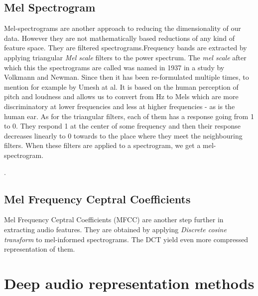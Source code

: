 \subsection{Mel Spectrogram}\label{ssec:mel_spectrograms_intro}
Mel-spectrograms are another approach to reducing the dimensionality of our data. However they are not mathematically based reductions of any kind of feature space. They are filtered spectrograms.Frequency bands are extracted by applying triangular \textit{Mel scale} filters to the power spectrum. The \textit{mel scale} after which this the spectrograms are called was named in 1937 in a study \cite{1937ASAJ....8..185S} by Volkmann and Newman. Since then it has been re-formulated multiple times, to mention for example \cite{mel_scale_fit} by Umesh at al. It is based on the human perception of pitch and loudness and allows us to convert from Hz to Mels which are more discriminatory at lower frequencies and less at higher frequencies - as is the human ear. As for the triangular filters, each of them has a response going from 1 to 0. They respond 1 at the center of some frequency and then their response decreases linearly to 0 towards to the place where they meet the neighbouring filters. When these filters are applied to a spectrogram, we get a mel-spectrogram.

. 

\subsection{Mel Frequency Ceptral Coefficients}
Mel Frequency Ceptral Coefficients (MFCC) are another step further in extracting audio features. They are obtained by applying \textit{Discrete cosine transform} to mel-informed spectrograms. The DCT yield even more compressed representation of them.

\section{Deep audio representation methods}

